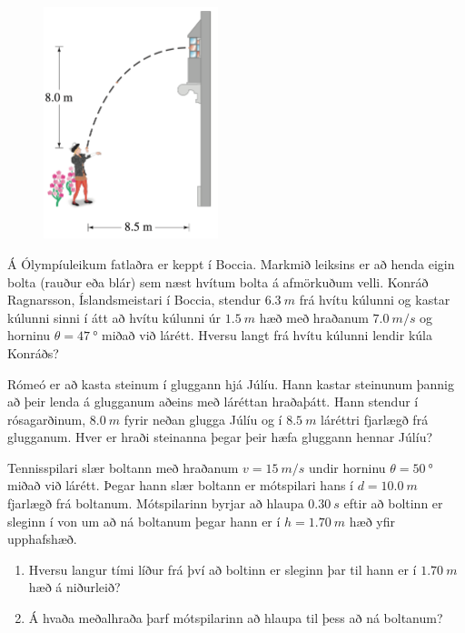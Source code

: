 \ifdefined \wholebook \else\documentclass[oneside]{book}\usepackage{EdlBook}\graphicspath{{figures/}}
\begin{document}
\begin{enumerate}[label = \textbf{Dæmi \thechapter.\arabic*.}]
\newpage


\begin{minipage}{\linewidth}
\begin{figure}
\vspace{-0.5cm}
\includegraphics[width=2in]{images/romeo.png}
\end{figure}

\item Á Ólympíuleikum fatlaðra er keppt í Boccia. Markmið leiksins er að henda eigin bolta (rauður eða blár) sem næst hvítum bolta á afmörkuðum velli. Konráð Ragnarsson, Íslandsmeistari í Boccia, stendur $\SI{6.3}{m}$ frá hvítu kúlunni og kastar kúlunni sinni í átt að hvítu kúlunni úr $\SI{1.5}{m}$ hæð með hraðanum $\SI{7.0}{m/s}$ og horninu $\theta = \SI{47}{\degree}$ miðað við lárétt. Hversu langt frá hvítu kúlunni lendir kúla Konráðs?

\item Rómeó er að kasta steinum í gluggann hjá Júlíu. Hann kastar steinunum þannig að þeir lenda á glugganum aðeins með láréttan hraðaþátt. Hann stendur í rósagarðinum, $\SI{8.0}{m}$ fyrir neðan glugga Júlíu og í $\SI{8.5}{m}$ láréttri fjarlægð frá glugganum. Hver er hraði steinanna þegar þeir hæfa gluggann hennar Júlíu?

\item Tennisspilari slær boltann með hraðanum $v = \SI{15}{m/s}$ undir horninu $\theta = \SI{50}{\degree}$ miðað við lárétt. Þegar hann slær boltann er mótspilari hans í $d = \SI{10.0}{m}$ fjarlægð frá boltanum. Mótspilarinn byrjar að hlaupa $\SI{0.30}{s}$ eftir að boltinn er sleginn í von um að ná boltanum þegar hann er í $h = \SI{1.70}{m}$ hæð yfir upphafshæð.
\begin{enumerate}[label = \textbf{(\alph*)}]
    \item Hversu langur tími líður frá því að boltinn er sleginn þar til hann er í $\SI{1.70}{m}$ hæð á niðurleið?
    \item Á hvaða meðalhraða þarf mótspilarinn að hlaupa til þess að ná boltanum?
\end{enumerate}


\end{minipage}
\end{enumerate}
\end{document}
